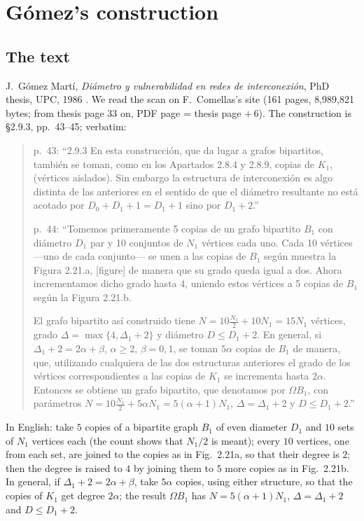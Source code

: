 \documentclass[11pt]{amsart}
\theoremstyle{plain}
\theoremstyle{definition}
\theoremstyle{remark}
\newcommand{\Om}{\Omega}
\begin{document}
\section{Gómez's construction}\label{sec:gomez}

\subsection{The text}
J.~Gómez Martí, \emph{Diámetro y vulnerabilidad en redes de interconexión}, PhD thesis, UPC, 1986 \cite{Go86}. We read the
scan on F.~Comellas's site (161 pages, 8,989,821 bytes; from thesis page 33 on, PDF page = thesis page $+\,6$). The
construction is \S2.9.3, pp.~43--45; verbatim:
\begin{quote}\small
p.~43: ``2.9.3 En esta construcción, que da lugar a grafos bipartitos, también se toman, como en los Apartados 2.8.4 y
2.8.9, copias de $K_1$, (vértices aislados). Sin embargo la estructura de interconexión es algo distinta de las
anteriores en el sentido de que el diámetro resultante no está acotado por $D_0 + D_1 + 1 = D_1 + 1$ sino por $D_1 + 2$.''

p.~44: ``Tomemos primeramente 5 copias de un grafo bipartito $B_1$ con diámetro $D_1$ par y 10 conjuntos de $N_1$
vértices cada uno. Cada 10 vértices ---uno de cada conjunto--- se unen a las copias de $B_1$ según muestra la Figura
2.21.a, [figure] de manera que su grado queda igual a dos. Ahora incrementamos dicho grado hasta 4, uniendo estos
vértices a 5 copias de $B_1$ según la Figura 2.21.b.

El grafo bipartito así construido tiene $N = 10\frac{N_1}{2} + 10N_1 = 15N_1$ vértices, grado
$\Delta = \max\{4, \Delta_1+2\}$ y diámetro $D \le D_1 + 2$. En general, si $\Delta_1 + 2 = 2\alpha + \beta$,
$\alpha \ge 2$, $\beta = 0, 1$, se toman $5\alpha$ copias de $B_1$ de manera, que, utilizando cualquiera de las dos
estructuras anteriores el grado de los vértices correspondientes a las copias de $K_1$ se incrementa hasta $2\alpha$.
Entonces se obtiene un grafo bipartito, que denotamos por $\Om B_1$, con parámetros
$N = 10\frac{N_1}{2} + 5\alpha N_1 = 5(\alpha+1)N_1$, $\Delta = \Delta_1 + 2$ y $D \le D_1 + 2$.''
\end{quote}
In English: take $5$ copies of a bipartite graph $B_1$ of even diameter $D_1$ and $10$ sets of $N_1$ vertices each (the
count shows that $N_1/2$ is meant); every $10$ vertices, one from each set, are joined to the copies as in Fig.~2.21a,
so that their degree is $2$; then the degree is raised to $4$ by joining them to $5$ more copies as in Fig.~2.21b. In
general, if $\Delta_1 + 2 = 2\alpha + \beta$, take $5\alpha$ copies, using either structure, so that the copies of $K_1$
get degree $2\alpha$; the result $\Om B_1$ has $N = 5(\alpha+1)N_1$, $\Delta = \Delta_1 + 2$ and $D \le D_1 + 2$.
\end{document}
